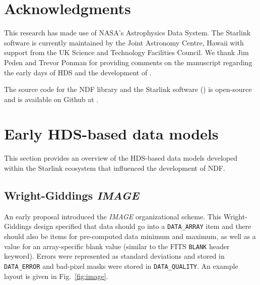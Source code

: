 \documentclass[final,authoryear,5p,times,twocolumn]{elsarticle}
\begin{document}
\section{Acknowledgments}

This research has made use of NASA's Astrophysics Data System.
The Starlink software is currently maintained by the Joint Astronomy
Centre, Hawaii with support from the UK Science and Technology
Facilities Council. We thank Jim Peden and Trevor Ponman for providing
comments on the manuscript regarding the early days of HDS and the
development of \asterix.

The source code for the NDF library and the Starlink software
() is open-source and is available on Github at
.


\appendix

\section{Early HDS-based data models}
\label{app:chaos}

This section provides an overview of the HDS-based data models
developed within the Starlink ecosystem that influenced the
development of NDF.

\subsection{Wright-Giddings \emph{IMAGE}}
\label{app:image}

An early proposal \citep[][but see also \citet{SGP38}]{WrightGiddings1983} introduced the
\emph{IMAGE} organizational scheme. This Wright-Giddings design specified that
data should go into a \texttt{DATA\_ARRAY} item and there should also be
items for pre-computed data minimum and maximum, as well as a value for
an array-specific blank value (similar to the FITS \texttt{BLANK}
header keyword). Errors were represented as standard
deviations and stored in \texttt{DATA\_ERROR} and bad-pixel masks were
stored in \texttt{DATA\_QUALITY}. An example layout is given in Fig.~\ref{fig:image}.
\end{document}
